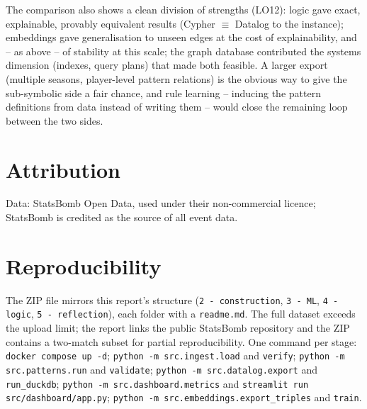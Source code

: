 \documentclass[11pt,a4paper]{article}
\begin{document}
The comparison also shows a clean division of strengths (LO12): logic gave
exact, explainable, provably equivalent results (Cypher $\equiv$ Datalog to the
instance); embeddings gave generalisation to unseen edges at the cost of
explainability, and -- as above -- of stability at this scale; the graph
database contributed the systems dimension (indexes, query plans) that made both
feasible. A larger export (multiple seasons, player-level pattern relations) is
the obvious way to give the sub-symbolic side a fair chance, and rule learning
-- inducing the pattern definitions from data instead of writing them -- would
close the remaining loop between the two sides.

\section*{Attribution}
Data: StatsBomb Open Data, used under their non-commercial licence; StatsBomb is
credited as the source of all event data. %

\appendix
\section{Reproducibility}
The ZIP file mirrors this report's structure (\texttt{2 - construction},
\texttt{3 - ML}, \texttt{4 - logic}, \texttt{5 - reflection}), each folder with
a \texttt{readme.md}. The full dataset exceeds the upload limit; the report links
the public StatsBomb repository and the ZIP contains a two-match subset for
partial reproducibility. One command per stage: \texttt{docker compose up -d};
\texttt{python -m src.ingest.load} and \texttt{verify};
\texttt{python -m src.patterns.run} and \texttt{validate};
\texttt{python -m src.datalog.export} and \texttt{run\_duckdb};
\texttt{python -m src.dashboard.metrics} and
\texttt{streamlit run src/dashboard/app.py};
\texttt{python -m src.embeddings.export\_triples} and \texttt{train}.
\end{document}
